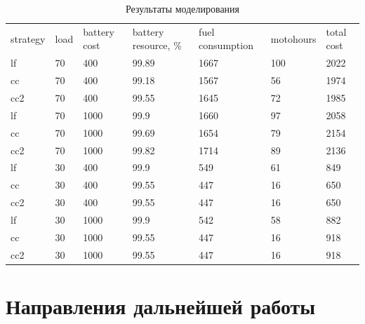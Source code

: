 \documentclass{report}
\begin{document}
\begin{table}[h]
\caption{Результаты моделирования}
\label{t:res}
\begin{tabular}{lllllll}
strategy & load & battery cost & battery resource, \% & fuel consumption & motohours & total cost \\
lf       & 70   & 400          & 99.89                & 1667             & 100       & 2022       \\
cc       & 70   & 400          & 99.18                & 1567             & 56        & 1974       \\
cc2      & 70   & 400          & 99.55                & 1645             & 72        & 1985       \\
lf       & 70   & 1000         & 99.9                 & 1660             & 97        & 2058       \\
cc       & 70   & 1000         & 99.69                & 1654             & 79        & 2154       \\
cc2      & 70   & 1000         & 99.82                & 1714             & 89        & 2136       \\
lf       & 30   & 400          & 99.9                 & 549              & 61        & 849        \\
cc       & 30   & 400          & 99.55                & 447              & 16        & 650        \\
cc2      & 30   & 400          & 99.55                & 447              & 16        & 650        \\
lf       & 30   & 1000         & 99.9                 & 542              & 58        & 882        \\
cc       & 30   & 1000         & 99.55                & 447              & 16        & 918        \\
cc2      & 30   & 1000         & 99.55                & 447              & 16        & 918       
\end{tabular}
\end{table}

\section{Направления дальнейшей работы}
\end{document}
